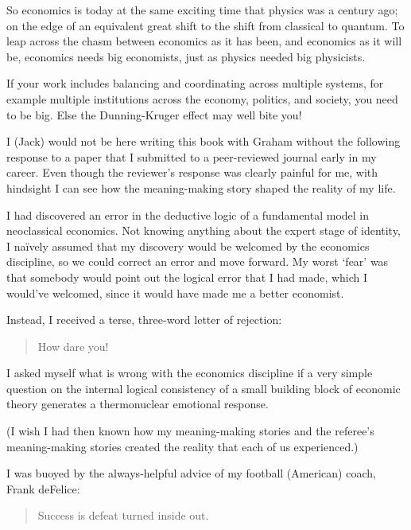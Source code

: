 So economics  is today at the same exciting time that physics was a century ago; on the edge of an equivalent great shift to the shift from classical to quantum. To leap across the chasm between economics as it has been, and economics as it will be, economics needs big economists, just as physics needed big physicists. 


If your work includes balancing and coordinating across multiple systems, for example multiple institutions across the economy, politics, and society, you need to be big. Else the Dunning-Kruger effect  may well bite you!


\begin{longstoryblock}
I (Jack) would not be here writing this book with Graham without the following response to a paper that I submitted to a peer-reviewed journal early in my career. Even though the reviewer’s response was clearly painful for me, with hindsight I can see how the meaning\hyp{}making story shaped the reality of my life.


I had discovered an error in the deductive logic of a fundamental model in neoclassical economics. Not knowing anything about the expert stage of identity, I naïvely assumed that my discovery would be welcomed by the economics discipline, so we could correct an error and move forward. My worst ‘fear’ was that somebody would point out the logical error that I had made, which I would’ve welcomed, since it would have made me a better economist.


Instead, I received a terse, three-word letter of  rejection: 


\begin{quote}
How dare you! 
\end{quote} 


I asked myself what is wrong with the economics discipline if a very simple question on the internal logical consistency of a small building block of economic theory generates a thermonuclear emotional response.  


(I wish I had then known how my meaning\hyp{}making stories and the referee's meaning\hyp{}making stories created the reality that each of us experienced.)


I was buoyed by the always-helpful advice of my football (American) coach, Frank deFelice:


\begin{quote}
Success is defeat turned inside out.
\end{quote}



\end{longstoryblock}
